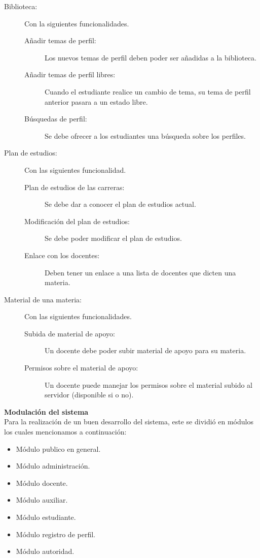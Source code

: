 \documentclass[10pt,letterpaper,twoside]{article}
\newcommand{\btext}[1]{
    \vspace{10mm}
    {{\textcolor{titlecolor}{\large{\textbf{\textsf{#1}}}}}}
    \vspace{5mm}
    \\
}
\begin{document}
\begin{multicols}{2}
\begin{description}
\item [Biblioteca:] Con la siguientes funcionalidades.
\begin{description}
    \item [Añadir temas de perfil:] Los nuevos temas de perfil deben poder ser añadidas a la biblioteca.
    \item [Añadir temas de perfil libres:] Cuando el estudiante realice un cambio de tema, su tema de perfil anterior pasara a un estado libre.
    \item [Búsquedas de perfil:] Se debe ofrecer a los estudiantes una búsqueda sobre los perfiles.
\end{description}
\item [Plan de estudios:] Con las siguientes funcionalidad.
\begin{description}
    \item [Plan de estudios de las carreras:] Se debe dar a conocer el plan de estudios actual.
    \item [Modificación del plan de estudios:] Se debe poder modificar el plan de estudios.
    \item [Enlace con los docentes:] Deben tener un enlace a una lista de docentes que dicten una materia.
\end{description}
\item [Material de una materia:] Con las siguientes funcionalidades.
\begin{description}
    \item [Subida de material de apoyo:] Un docente debe poder subir material de apoyo para su materia.
    \item [Permisos sobre el material de apoyo:] Un docente puede manejar los permisos sobre el material subido al servidor (disponible si o no).
\end{description}
\end{description}

\btext{Modulación del sistema}
Para la realización de un buen desarrollo del sistema, este se dividió en módulos los cuales mencionamos a continuación:
\begin{itemize}
    \item Módulo publico en general.
    \item Módulo administración.
    \item Módulo docente.
    \item Módulo auxiliar.
    \item Módulo estudiante.
    \item Módulo registro de perfil.
    \item Módulo autoridad.
\end{itemize}


\end{multicols}
\end{document}
